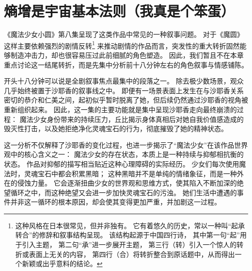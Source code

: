 \chapter[熵增是宇宙基本法则（我真是个笨蛋）]{熵增是宇宙基本法则\protect\footnotemark（我真是个笨蛋）}

《魔法少女小圆》第八集呈现了这类作品中常见的一种叙事问题。
对于《魔圆》这样主要依赖强烈的剧情反转\footnote{%
    这种风格在日本很常见，但并非独有。
    它有着悠久的历史，常以一种叫“起承转合”的修辞和叙事结构呈现。
    该结构起源于中国四行诗， 其中第一句“起”用于引入主题， 第二句“承”进一步展开主题， 第三行（转）引入一个惊人的转折或表面上无关的内容， 第四行（合）将转折整合到原话题中，从而得出一个新颖或出乎意料的结论。
} 来推动剧情的作品而言，突发性的重大转折固然能够制造冲击力，却也很容易压过此前细腻的角色塑造。
因此，我们暂且不在本章重点讨论这一结尾转折，而是先集中分析前十八分钟左右的角色叙事与情感铺陈。

开头十八分钟可以说是全剧叙事焦点最集中的段落之一。
除去极少数场景，观众几乎始终被置于沙耶香的叙事线之中。
即便有一场景表面上发生在与沙耶香关系密切的恭介和仁美之间，起初似乎暂时脱离了她，但后续仍然通过沙耶香的视角被重新组织起来。
因此，这一集的主要功能就是集中呈现沙耶香走向最终崩溃的过程：
魔法少女身份带来的持续压力，丘比揭示身体真相后对她自我价值感造成的毁灭性打击，以及她拒绝净化灵魂宝石的行为，彻底摧毁了她的精神状态。

这一分析不仅解释了沙耶香的变化过程，也进一步揭示了“魔法少女”在该作品世界观中的核心含义之一：
魔法少女的存在状态，本质上是一种持续与抑郁相抗衡的状态。
作品对抑郁的描写相当贴近这种心理障碍的实际经历。
少女们每次使用魔法时，灵魂宝石中都会积累黑暗；
这种黑暗并不是单纯的情绪象征，而是一种外在的侵蚀力量。
它会逐渐扭曲少女的世界观和思维方式，使其陷入不断加深的绝望循环之中，而这种绝望又会进一步加快灵魂宝石的污浊。
她们生活中遭遇的事件并非这一循环的根本原因，却会使其变得更加严重，并加剧这一过程\cite{ref44}。

